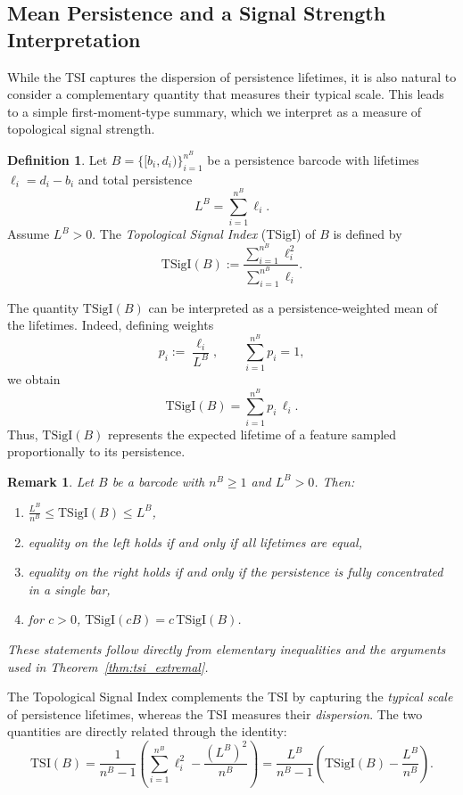 \documentclass[11pt]{amsart}
\newtheorem*{remark}{Remark}
\theoremstyle{definition}
\newtheorem{definition}{Definition}[section]
\begin{document}
\subsection{Mean Persistence and a Signal Strength Interpretation}

While the TSI captures the dispersion of persistence lifetimes, it is also natural to consider a complementary quantity that measures their typical scale. This leads to a simple first-moment-type summary, which we interpret as a measure of topological signal strength.

\begin{definition}
Let $B = \{[b_i, d_i)\}_{i=1}^{n^B}$ be a persistence barcode with lifetimes $\ell_i = d_i - b_i$ and total persistence
\[
L^B = \sum_{i=1}^{n^B} \ell_i.
\]
Assume $L^B > 0$. The \emph{Topological Signal Index} (TSigI) of $B$ is defined by
\begin{equation}
\label{eq:tsigi}
\mathrm{TSigI}(B) := \frac{\sum_{i=1}^{n^B} \ell_i^2}{\sum_{i=1}^{n^B} \ell_i}.
\end{equation}
\end{definition}

The quantity $\mathrm{TSigI}(B)$ can be interpreted as a persistence-weighted mean of the lifetimes. Indeed, defining weights
\[
p_i := \frac{\ell_i}{L^B}, \qquad \sum_{i=1}^{n^B} p_i = 1,
\]
we obtain
\[
\mathrm{TSigI}(B) = \sum_{i=1}^{n^B} p_i \, \ell_i.
\]
Thus, $\mathrm{TSigI}(B)$ represents the expected lifetime of a feature sampled proportionally to its persistence.

\begin{remark}\rm
Let $B$ be a barcode with $n^B \geq 1$ and $L^B > 0$. Then:
\begin{enumerate}
    \item $\displaystyle \frac{L^B}{n^B} \leq \mathrm{TSigI}(B) \leq L^B$,
    \item equality on the left holds if and only if all lifetimes are equal,
    \item equality on the right holds if and only if the persistence is fully concentrated in a single bar,
    \item for $c > 0$, $\mathrm{TSigI}(cB) = c\, \mathrm{TSigI}(B)$.
\end{enumerate}
These statements follow directly from elementary inequalities and the arguments used in Theorem~\ref{thm:tsi_extremal}.
\end{remark}

The Topological Signal Index complements the TSI by capturing the \emph{typical scale} of persistence lifetimes, whereas the TSI measures their \emph{dispersion}. The two quantities are directly related through the identity:
\begin{equation}
\label{eq:tsi_tsigi_relation}
\mathrm{TSI}(B)
=
\frac{1}{n^B - 1}
\left(
\sum_{i=1}^{n^B} \ell_i^2 - \frac{(L^B)^2}{n^B}
\right)
=
\frac{L^B}{n^B - 1}
\left(
\mathrm{TSigI}(B) - \frac{L^B}{n^B}
\right).
\end{equation}
\end{document}
